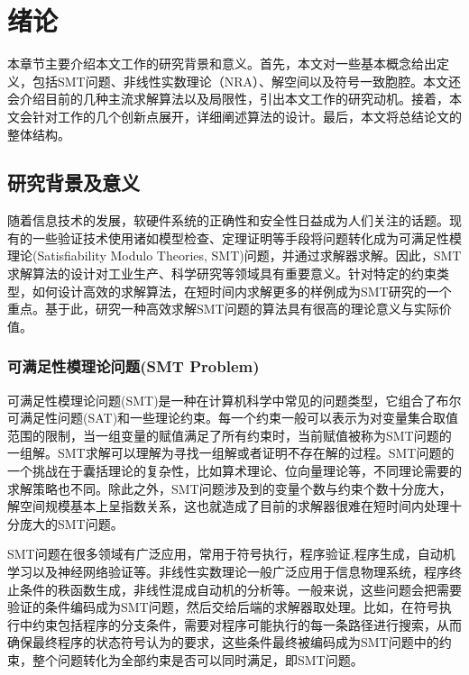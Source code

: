 \chapter{绪论}\label{chap:introduction}

本章节主要介绍本文工作的研究背景和意义。首先，本文对一些基本概念给出定义，包括SMT问题、非线性实数理论（NRA）、解空间以及符号一致胞腔。本文还会介绍目前的几种主流求解算法以及局限性，引出本文工作的研究动机。接着，本文会针对工作的几个创新点展开，详细阐述算法的设计。最后，本文将总结论文的整体结构。

\section{研究背景及意义}
随着信息技术的发展，软硬件系统的正确性和安全性日益成为人们关注的话题。现有的一些验证技术使用诸如模型检查、定理证明等手段将问题转化成为可满足性模理论(Satisfiability Modulo Theories, SMT)问题，并通过求解器求解。因此，SMT求解算法的设计对工业生产、科学研究等领域具有重要意义。针对特定的约束类型，如何设计高效的求解算法，在短时间内求解更多的样例成为SMT研究的一个重点。基于此，研究一种高效求解SMT问题的算法具有很高的理论意义与实际价值。

\subsection{可满足性模理论问题(SMT Problem)}
可满足性模理论问题(SMT)是一种在计算机科学中常见的问题类型，它组合了布尔可满足性问题(SAT)和一些理论约束。每一个约束一般可以表示为对变量集合取值范围的限制，当一组变量的赋值满足了所有约束时，当前赋值被称为SMT问题的一组解。SMT求解可以理解为寻找一组解或者证明不存在解的过程。SMT问题的一个挑战在于囊括理论的复杂性，比如算术理论、位向量理论等，不同理论需要的求解策略也不同。除此之外，SMT问题涉及到的变量个数与约束个数十分庞大，解空间规模基本上呈指数关系，这也就造成了目前的求解器很难在短时间内处理十分庞大的SMT问题。

SMT问题在很多领域有广泛应用，常用于符号执行\cite{KLEE, DART}，程序验证\cite{AnalysisSymbol,VerificationSMT},程序生成\cite{synthesis1}，自动机学习\cite{Automata1,automata2}以及神经网络验证等\cite{NN1,NN2,NN3,NN4}。非线性实数理论一般广泛应用于信息物理系统\cite{CPS1,CPS2,CPS3}，程序终止条件的秩函数生成\cite{LeikeH15,HeizmannHLP13}，非线性混成自动机的分析\cite{CimattiMT12}等。一般来说，这些问题会把需要验证的条件编码成为SMT问题，然后交给后端的求解器取处理。比如，在符号执行中约束包括程序的分支条件，需要对程序可能执行的每一条路径进行搜索，从而确保最终程序的状态符号认为的要求，这些条件最终被编码成为SMT问题中的约束，整个问题转化为全部约束是否可以同时满足，即SMT问题。

